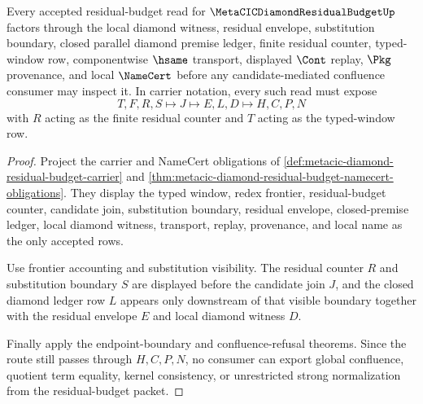 \begin{theorem}
\label{thm:metacic-diamond-residual-budget-carrier}
Every accepted residual-budget read for $\MetaCICDiamondResidualBudgetUp$ factors through the local diamond witness, residual envelope, substitution boundary, closed parallel diamond premise ledger, finite residual counter, typed-window row, componentwise $\hsame$ transport, displayed $\Cont$ replay, $\Pkg$ provenance, and local $\NameCert$ before any candidate-mediated confluence consumer may inspect it. In carrier notation, every such read must expose
$$
T,F,R,S \longmapsto J \longmapsto E,L,D \longmapsto H,C,P,N
$$
with $R$ acting as the finite residual counter and $T$ acting as the typed-window row.
\end{theorem}
\begin{proof}
Project the carrier and NameCert obligations of \autoref{def:metacic-diamond-residual-budget-carrier} and \autoref{thm:metacic-diamond-residual-budget-namecert-obligations}. They display the typed window, redex frontier, residual-budget counter, candidate join, substitution boundary, residual envelope, closed-premise ledger, local diamond witness, transport, replay, provenance, and local name as the only accepted rows.

Use frontier accounting and substitution visibility. The residual counter $R$ and substitution boundary $S$ are displayed before the candidate join $J$, and the closed diamond ledger row $L$ appears only downstream of that visible boundary together with the residual envelope $E$ and local diamond witness $D$.

Finally apply the endpoint-boundary and confluence-refusal theorems. Since the route still passes through $H,C,P,N$, no consumer can export global confluence, quotient term equality, kernel consistency, or unrestricted strong normalization from the residual-budget packet.
\end{proof}
